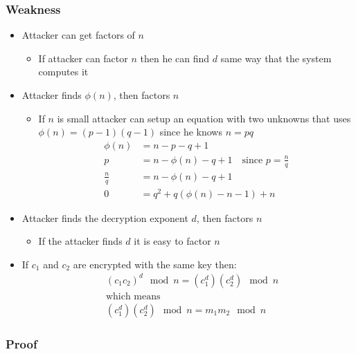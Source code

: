 \subsubsection*{Weakness}
\begin{itemize}
\item Attacker can get factors of $n$
  \begin{itemize}
  \item If attacker can factor $n$ then he can find $d$ same way that
    the system computes it
  \end{itemize}
\item Attacker finds $\phi (n)$, then factors $n$
  \begin{itemize}
  \item If $n$ is small attacker can setup an equation with two unknowns
    that uses $\phi (n)=(p-1)(q-1)$ since he knows $n=pq$
    \begin{align*}
      \phi(n) &= n - p - q + 1 \\
      p &= n - \phi(n) - q + 1 \quad \text{since } p = \frac{n}{q} \\
      \frac{n}{q} &= n - \phi(n) - q + 1 \\
      0 &= q^2 + q(\phi(n) - n - 1) + n
    \end{align*}
  \end{itemize}
\item Attacker finds the decryption exponent $d$, then factors $n$
  \begin{itemize}
  \item If the attacker finds $d$ it is easy to factor $n$
  \end{itemize}
\item If $c_1$ and $c_2$ are encrypted with the same key then:
  \begin{align*}
    &(c_1c_2)^d \mod n = (c_1^d) (c_2^d) \mod n \\
    &\text{which means} \\
    &(c_1^d) (c_2^d) \mod n = m_1m_2 \mod n
  \end{align*}
\end{itemize}
\subsubsection*{Proof}

